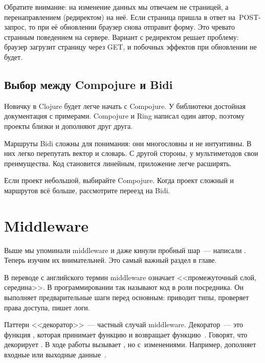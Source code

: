 \fi


Обратите внимание: на изменение данных мы отвечаем не страницей, а
перенаправлением (редиректом) на неё. Если страница пришла в ответ
на~POST-запрос, то при её обновлении браузер снова отправит форму. Это чревато
странным поведением на сервере. Вариант с редиректом решает проблему: браузер
загрузит страницу через GET, и побочных эффектов при обновлении не будет.

\subsection{Выбор между Compojure и Bidi}

Новичку в Clojure будет легче начать с Compojure. У библиотеки достойная
документация с примерами. Compojure и Ring написал один автор, поэтому проекты
близки и дополняют друг друга.

Маршруты Bidi сложны для понимания: они многословны и не интуитивны. В них легко
перепутать вектор и словарь. С другой стороны, у мультиметодов свои
преимущества. Код становится линейным, приложение легче расширять.

Если проект небольшой, выбирайте Compojure. Когда проект сложный и маршрутов всё
больше, рассмотрите переезд на Bidi.

\section{Middleware}


Выше мы упоминали middleware и даже кинули пробный шар~--- написали
 . Теперь изучим их внимательней. Это
самый важный раздел в главе.

В переводе с английского термин middleware означает <<промежуточный слой,
середина>>. В программировании так называют код в роли посредника. Он выполняет
предварительные шаги перед основным: приводит типы, проверяет права доступа,
пишет логи.

\label{decorator}


Паттерн <<декоратор>>~--- частный случай middleware. Декоратор~--- это функция
, которая принимает функцию  и возвращает
функцию~. Говорят, что  декорирует . В ходе работы
 вызывает , но с~изменениями. Например, дополняет входные
или выходные данные~.

